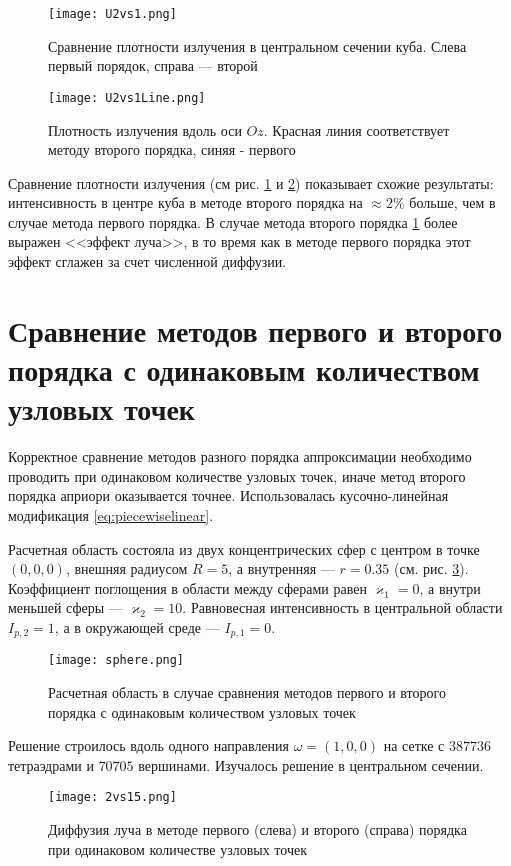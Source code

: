 \begin{figure}[ht!]
\centering
\texttt{[image: U2vs1.png]}
\caption{Сравнение плотности излучения в центральном сечении куба. Слева первый порядок, справа --- второй}
\label{fig:9}
\end{figure}

\begin{figure}[ht!]
\centering
\texttt{[image: U2vs1Line.png]}
\caption{Плотность излучения вдоль оси $Oz$. Красная линия соответствует методу второго порядка, синяя - первого}
\label{fig:10}
\end{figure}
Сравнение плотности излучения (см рис. \ref{fig:9} и \ref{fig:10}) показывает схожие результаты: интенсивность в центре куба в методе второго порядка на $\approx 2 \%$ больше, чем в случае метода первого порядка. В случае метода второго порядка \ref{fig:9} более выражен <<эффект луча>>, в то время как в методе первого порядка этот эффект сглажен за счет численной диффузии. 

\section{Сравнение методов первого и второго порядка с одинаковым количеством узловых точек}

Корректное сравнение методов разного порядка аппроксимации необходимо проводить при одинаковом количестве узловых точек, иначе метод второго порядка априори оказывается точнее. Использовалась кусочно-линейная модификация \eqref{eq:piecewiselinear}.

Расчетная область состояла из двух концентрических сфер с центром в точке $(0,0,0)$, внешняя радиусом $R = 5$, а внутренняя --- $r = 0.35$ (см. рис. \ref{fig:11}). Коэффициент поглощения в области между сферами равен $\varkappa_1 = 0$, а внутри меньшей сферы --- $\varkappa_2 = 10$. Равновесная интенсивность в центральной области $I_{p,2} = 1$, а в окружающей среде --- $I_{p,1} = 0$. 
\begin{figure}[ht!]
\centering
\texttt{[image: sphere.png]}
\caption{Расчетная область в случае сравнения методов первого и второго порядка с одинаковым количеством узловых точек}
\label{fig:11}
\end{figure}
Решение строилось вдоль одного направления $\omega = (1, 0, 0)$ на сетке с $387736$ тетраэдрами и $70705$ вершинами. Изучалось решение в центральном сечении. 
\begin{figure}[ht!]
\centering
\texttt{[image: 2vs15.png]}
\caption{Диффузия луча в методе первого (слева) и второго (справа) порядка при одинаковом количестве узловых точек}
\label{fig:12}
\end{figure}

